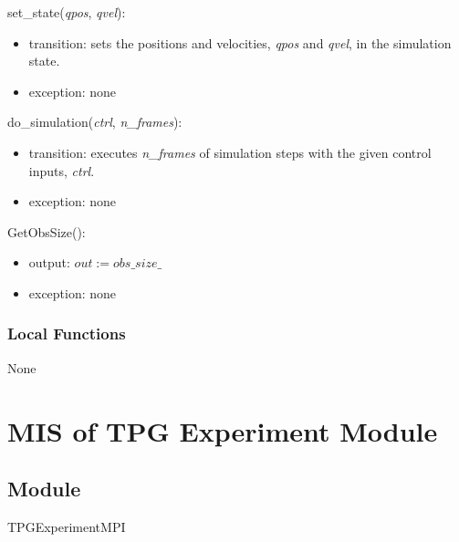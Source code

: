 \documentclass[12pt, titlepage]{article}
\begin{document}
\noindent set\_state(\textit{qpos}, \textit{qvel}):
\begin{itemize}
\item transition: sets the positions and velocities, \textit{qpos} and \textit{qvel}, in the simulation state.
\item exception: none
\end{itemize}

\noindent do\_simulation(\textit{ctrl}, \textit{n\_frames}):
\begin{itemize}
\item transition: executes \textit{n\_frames} of simulation steps with the given control inputs, \textit{ctrl}.
\item exception: none 
\end{itemize}

\noindent GetObsSize():
\begin{itemize}
\item output: $out := obs\_size\_$
\item exception: none
\end{itemize}



\subsubsection{Local Functions}

None

\section{MIS of TPG Experiment Module} \label{TPGExperimentModule}

\subsection{Module}
TPGExperimentMPI
\end{document}
